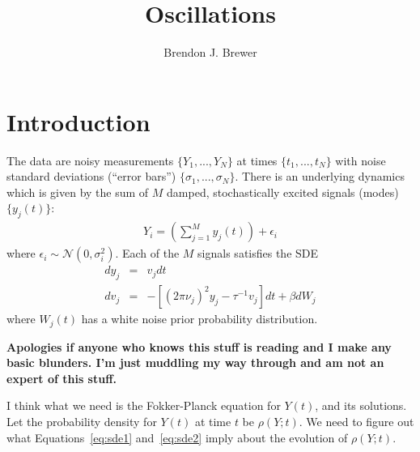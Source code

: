 \documentclass[letterpaper, 11pt]{article}
\title{Oscillations}
\author{Brendon J. Brewer}
\begin{document}
\maketitle

\section{Introduction}
The data are noisy measurements $\{Y_1, ..., Y_N\}$ at times
$\{t_1, ..., t_N\}$ with noise standard deviations (``error bars'')
$\{\sigma_1, ..., \sigma_N\}$. There is an underlying dynamics which is
given by the sum of $M$ damped, stochastically excited signals (modes)
$\{y_j(t)\}$:
\begin{eqnarray}
Y_i = \left(\sum_{j=1}^M y_j(t)\right) + \epsilon_i
\end{eqnarray}
where $\epsilon_i \sim \mathcal{N}(0, \sigma_i^2)$.
Each of the $M$ signals satisfies the SDE
\begin{eqnarray}
dy_j &=& v_j dt\label{eq:sde1}\\
dv_j &=& -\left[(2\pi\nu_j)^2y_j - \tau^{-1}v_j\right]dt + \beta dW_j\label{eq:sde2}
\end{eqnarray}
where $W_j(t)$ has a white noise prior probability distribution.

{\bf Apologies if anyone who knows this stuff is reading and I make any basic
blunders. I'm just muddling my way through and am not an expert of this stuff.}

I think what we need is the Fokker-Planck equation for $Y(t)$, and its
solutions. Let the probability density for $Y(t)$ at time $t$ be
$\rho(Y; t)$. We need to figure out what Equations~\ref{eq:sde1}
and~\ref{eq:sde2} imply about the evolution of $\rho(Y; t)$.
\end{document}
